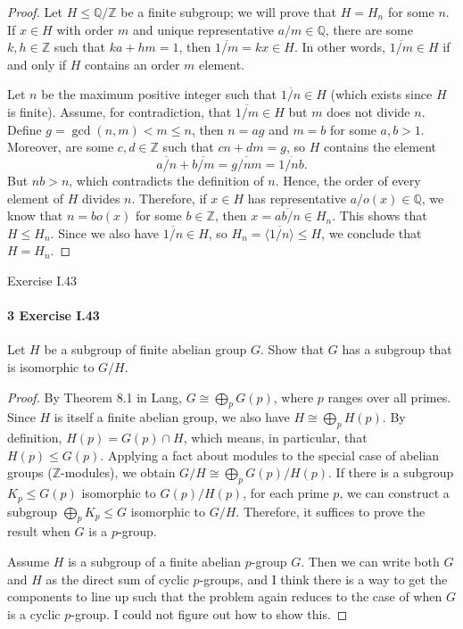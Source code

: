\documentclass[12pt]{article}
\newlength{\myparskip}
\newenvironment{fullbox}{\begin{lrbox}{\savefullbox}\begin{minipage}{\dimexpr\textwidth-2\fboxsep\relax}\setlength{\parskip}{\myparskip}}{\end{minipage}\end{lrbox}\framebox[\textwidth]{\usebox{\savefullbox}}}
\newenvironment{pbox}[1][]{\begin{fullbox}\ifx#1\empty\else\paragraph{#1}\fi}{\end{fullbox}}
\newcommand{\Z}{\mathbb{Z}}
\newcommand{\Q}{\mathbb{Q}}
\newcommand{\<}{\langle}
\renewcommand{\>}{\rangle}
\newcommand{\isom}{\cong}
\newcommand{\eqc}{\overline}
\begin{document}
\begin{proof}
    Let $H \leq \Q/\Z$ be a finite subgroup; we will prove that $H = H_n$ for some $n$. If $x \in H$ with order $m$ and unique representative $a/m \in \Q$, there are some $k, h \in \Z$ such that $ka + hm = 1$, then $\eqc{1/m} = kx \in H$. In other words, $\eqc{1/m} \in H$ if and only if $H$ contains an order $m$ element.
    
    Let $n$ be the maximum positive integer such that $\eqc{1/n} \in H$ (which exists since $H$ is finite). Assume, for contradiction, that $\eqc{1/m} \in H$ but $m$ does not divide $n$. Define $g = \gcd(n, m) < m \leq n$, then $n = ag$ and $m = b$ for some $a, b > 1$. Moreover, are some $c, d \in \Z$ such that $cn + dm = g$, so $H$ contains the element
    \[
        \eqc{a/n} + \eqc{b/m} = \eqc{g/nm} = \eqc{1/nb}.
    \]
    But $nb > n$, which contradicts the definition of $n$. Hence, the order of every element of $H$ divides $n$. Therefore, if $x \in H$ has representative $a/o(x) \in \Q$, we know that $n = bo(x)$ for some $b \in \Z$, then $x = \eqc{ab/n} \in H_n$. This shows that $H \leq H_n$. Since we also have $\eqc{1/n} \in H$, so $H_n = \<\eqc{1/n}\> \leq H$, we conclude that $H = H_n$.
    

\end{proof}


\newpage
\begin{pbox}[3 Exercise I.43]
    Let $H$ be a subgroup of finite abelian group $G$. Show that $G$ has a subgroup that is isomorphic to $G/H$.
\end{pbox}

\begin{proof}
    By Theorem 8.1 in Lang, $G \isom \bigoplus_{p} G(p)$, where $p$ ranges over all primes. Since $H$ is itself a finite abelian group, we also have $H \isom \bigoplus_p H(p)$. By definition, $H(p) = G(p) \cap H$, which means, in particular, that $H(p) \leq G(p)$. Applying a fact about modules to the special case of abelian groups ($\Z$-modules), we obtain $G/H \isom \bigoplus_p G(p)/H(p)$. If there is a subgroup $K_p \leq G(p)$ isomorphic to $G(p)/H(p)$, for each prime $p$, we can construct a subgroup $\bigoplus_p K_p \leq G$ isomorphic to $G/H$. Therefore, it suffices to prove the result when $G$ is a $p$-group.

    Assume $H$ is a subgroup of a finite abelian $p$-group $G$. Then we can write both $G$ and $H$ as the direct sum of cyclic $p$-groups, and I think there is a way to get the components to line up such that the problem again reduces to the case of when $G$ is a cyclic $p$-group. I could not figure out how to show this.

\end{proof}
\end{document}
